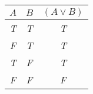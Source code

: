 
\begin{center}
\begin{tabular}{c c||c}
$A$  & $B$ & $(A \lor B)$\\
\hline
\emph{T} & \emph{T} & \emph{T} \\
\emph{F} & \emph{T} & \emph{T} \\
\emph{T} & \emph{F} & \emph{T}  \\
\emph{F} & \emph{F} & \emph{F} \\
\end{tabular}
\end{center}

